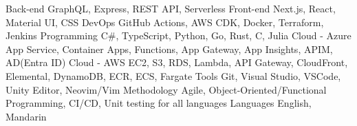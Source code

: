 \begin{cvskills}
  \cvskill
    {Back-end} %
    {GraphQL, Express, REST API, Serverless} %
  \cvskill
    {Front-end} %
    {Next.js, React, Material UI, CSS} %
  \cvskill
    {DevOps} %
    {GitHub Actions, AWS CDK, Docker, Terraform, Jenkins} %
  \cvskill
    {Programming} %
    {C\#, TypeScript, Python, Go, Rust, C, Julia} %
  \cvskill
    {Cloud - Azure} %
    {App Service, Container Apps, Functions, App Gateway, App Insights, APIM, AD(Entra ID)} %
  \cvskill
    {Cloud - AWS} %
    {EC2, S3, RDS, Lambda, API Gateway, CloudFront, Elemental, DynamoDB, ECR, ECS, Fargate} %
  \cvskill
    {Tools} %
    {Git, Visual Studio, VSCode, Unity Editor, Neovim/Vim} %
  \cvskill
    {Methodology} %
    {Agile, Object-Oriented/Functional Programming, CI/CD, Unit testing for all languages} %
  \cvskill
    {Languages} %
    {English, Mandarin} %
\end{cvskills}
